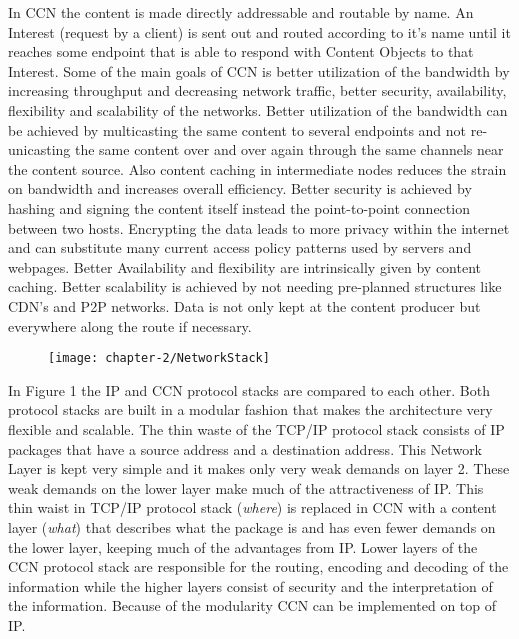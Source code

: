 \vspace{5mm} %

In CCN the content is made directly addressable and routable by name. An Interest (request by a client) is sent out and routed according to it's name until it reaches some endpoint that is able to respond with Content Objects to that Interest. Some of the main goals of CCN is better utilization of the bandwidth by increasing throughput and decreasing network traffic, better security, availability, flexibility and scalability of the networks. Better utilization of the bandwidth can be achieved by multicasting the same content to several endpoints and not re-unicasting the same content over and over again through the same channels near the content source. Also content caching in intermediate nodes reduces the strain on bandwidth and increases overall efficiency. Better security is achieved by hashing and signing the content itself instead the point-to-point connection between two hosts. Encrypting the data leads to more privacy within the internet and can substitute many current access policy patterns used by servers and webpages. Better Availability and flexibility are intrinsically given by content caching. Better scalability is achieved by not needing pre-planned structures like CDN's and P2P networks. Data is not only kept at the content producer but everywhere along the route if necessary.

\begin{figure}[H]
\texttt{[image: chapter-2/NetworkStack]}
\centering
\end{figure}

In Figure 1 the IP and CCN protocol stacks are compared to each other. Both protocol stacks are built in a modular fashion that makes the architecture very flexible and scalable. The thin waste of the TCP/IP protocol stack consists of IP packages that have a source address and a destination address. This Network Layer is kept very simple and it makes only very weak demands on layer 2. These weak demands on the lower layer make much of the attractiveness of IP. This thin waist in TCP/IP protocol stack (\emph{where}) is replaced in CCN with a content layer (\emph{what}) that describes what the package is and has even fewer demands on the lower layer, keeping much of the advantages from IP. Lower layers of the CCN protocol stack are responsible for the routing, encoding and decoding of the information while the higher layers consist of security and the interpretation of the information. Because of the modularity CCN can be implemented on top of IP.

